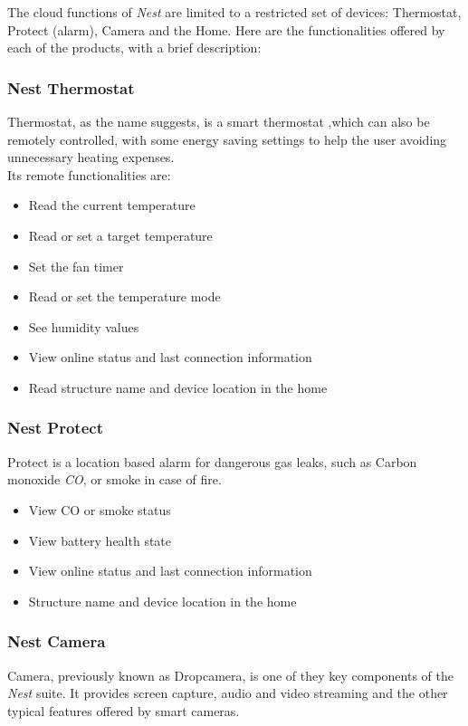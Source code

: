 The cloud functions of \textit{Nest} are limited to a restricted set of devices:
Thermostat, Protect (alarm), Camera and the Home.
Here are the functionalities offered by each of the products, with a brief description:
\subsubsection{Nest Thermostat}
Thermostat, as the name suggests, is a smart thermostat ,which can also be remotely controlled,
with some energy saving settings to help the user avoiding unnecessary heating expenses.   \\
Its remote functionalities are:

\begin{itemize}
    \item Read the current temperature
    \item Read or set a target temperature
    \item Set the fan timer
    \item Read or set the temperature mode
    \item See humidity values
    \item View online status and last connection information
    \item Read structure name and device location in the home
\end{itemize}

\subsubsection{Nest Protect}
Protect is a location based alarm for dangerous gas leaks, such as  Carbon monoxide \textit{CO}, or
smoke in case of fire.

\begin{itemize}
    \item View CO or smoke status
    \item View battery health state
    \item View online status and last connection information
    \item Structure name and device location in the home
\end{itemize}

\subsubsection{Nest Camera}
Camera, previously known as Dropcamera, is one of they key components of the
\textit{Nest} suite. It provides screen capture, audio and video streaming and the
other typical features offered by smart cameras.

